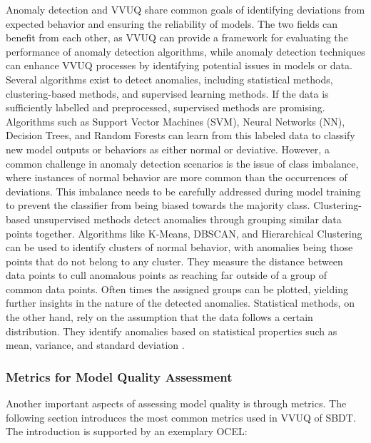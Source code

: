 Anomaly detection and VVUQ share common goals of identifying deviations from expected behavior and ensuring the reliability of models. The two fields can benefit from each other, as VVUQ can provide a framework for evaluating the performance of anomaly detection algorithms, while anomaly detection techniques can enhance VVUQ processes by identifying potential issues in models or data.
Several algorithms exist to detect anomalies, including statistical methods, clustering-based methods, and supervised learning methods. If the data is sufficiently labelled and preprocessed, supervised methods are promising. Algorithms such as Support Vector Machines (SVM), Neural Networks (NN), Decision Trees, and Random Forests can learn from this labeled data to classify new model outputs or behaviors as either normal or deviative. However, a common challenge in anomaly detection scenarios is the issue of class imbalance, where instances of normal behavior are more common than the occurrences of deviations. This imbalance needs to be carefully addressed during model training to prevent the classifier from being biased towards the majority class. Clustering-based unsupervised methods detect anomalies through grouping similar data points together. Algorithms like K-Means, DBSCAN, and Hierarchical Clustering can be used to identify clusters of normal behavior, with anomalies being those points that do not belong to any cluster. They measure the distance between data points to cull anomalous points as reaching far outside of a group of common data points. Often times the assigned groups can be plotted, yielding further insights in the nature of the detected anomalies. Statistical methods, on the other hand, rely on the assumption that the data follows a certain distribution. They identify anomalies based on statistical properties such as mean, variance, and standard deviation \parencite{chandola2009anomaly}.

\subsubsection*{Metrics for Model Quality Assessment}
\label{sec:metrics-theory}
Another important aspects of assessing model quality is through metrics. The following section introduces the most common metrics used in VVUQ of SBDT. The introduction is supported by an exemplary OCEL:

